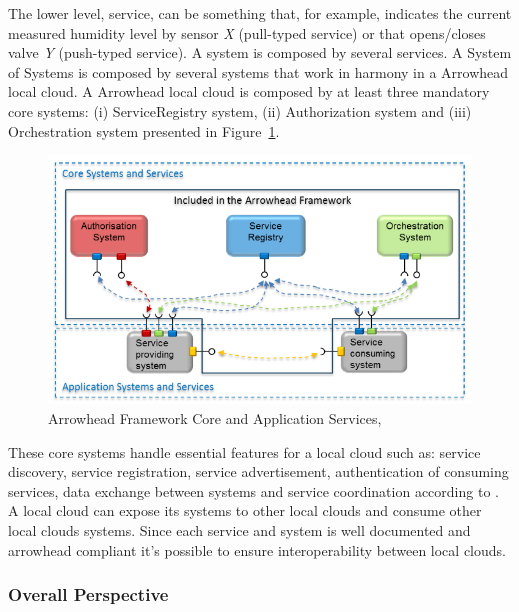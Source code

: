 The lower level, service, can be something that, for example, indicates the current measured humidity level by sensor \textit{X} (pull-typed service) or that opens/closes valve \textit{Y} (push-typed service). A system is composed by several services. A System of Systems is composed by several systems that work in harmony in a Arrowhead local cloud. A Arrowhead local cloud is composed by at least three mandatory core systems: (i) ServiceRegistry system, (ii) Authorization system and (iii) Orchestration system presented in Figure~\ref{fig:stateofart:arch:arrowhead:system}.

\begin{figure}[H]
    \centering
    \includegraphics[scale=0.6]{assets/figures/arrowhead.png}
    \caption[Arrowhead Framework Core and Application Services]{Arrowhead Framework Core and Application Services, \cite{blomstedt2014arrowhead}}
    \label{fig:stateofart:arch:arrowhead:system}
\end{figure}

These core systems handle essential features for a local cloud such as: service discovery, service registration, service advertisement, authentication of consuming services, data exchange between systems and service coordination according to \cite{marcu2020arrowhead}. A local cloud can expose its systems to other local clouds and consume other local clouds systems. Since each service and system is well documented and arrowhead compliant it's possible to ensure interoperability between local clouds.

\subsubsection{Overall Perspective}
\label{subsec:stateofart:arch:prepective}

